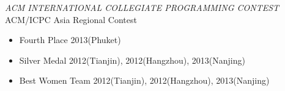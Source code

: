\documentclass[margin, 10pt]{res} %
\begin{document}
\begin{resume}
{\sl ACM INTERNATIONAL COLLEGIATE PROGRAMMING CONTEST} \\
ACM/ICPC Asia Regional Contest 

\begin{itemize} \itemsep -2pt %
\item Fourth Place \hfill 2013(Phuket)
\item Silver Medal \hfill 2012(Tianjin), 2012(Hangzhou), 2013(Nanjing) 
\item Best Women Team \hfill 2012(Tianjin), 2012(Hangzhou), 2013(Nanjing) 
\end{itemize}
 
\end{resume}
\end{document}
